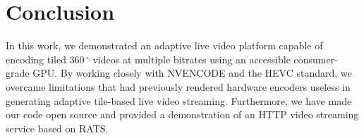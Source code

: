 



\section{Conclusion} \label{concl}

In this work, we demonstrated an adaptive live video platform capable of encoding tiled $360\,^{\circ}$ videos at multiple bitrates using an accessible consumer-grade GPU. By working closely with NVENCODE and the HEVC standard, we overcame limitations that had previously rendered hardware encoders useless in generating adaptive tile-based live video streaming. Furthermore, we have made our code open source and provided a demonstration of an HTTP video streaming service based on RATS.

